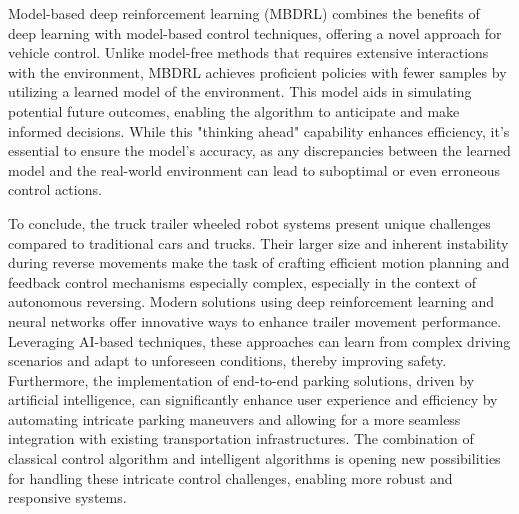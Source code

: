 Model-based deep reinforcement learning (MBDRL) combines the benefits of deep learning with model-based control techniques, offering a novel approach for vehicle control. Unlike model-free methods that requires extensive interactions with the environment, MBDRL achieves proficient policies with fewer samples by utilizing a learned model of the environment. This model aids in simulating potential future outcomes, enabling the algorithm to anticipate and make informed decisions. While this "thinking ahead" capability enhances efficiency, it's essential to ensure the model's accuracy, as any discrepancies between the learned model and the real-world environment can lead to suboptimal or even erroneous control actions.

To conclude, the truck trailer wheeled robot systems present unique challenges compared to traditional cars and trucks. Their larger size and inherent instability during reverse movements make the task of crafting efficient motion planning and feedback control mechanisms especially complex, especially in the context of autonomous reversing. Modern solutions using deep reinforcement learning and neural networks offer innovative ways to enhance trailer movement performance. Leveraging AI-based techniques, these approaches can learn from complex driving scenarios and adapt to unforeseen conditions, thereby improving safety. Furthermore, the implementation of end-to-end parking solutions, driven by artificial intelligence, can significantly enhance user experience and efficiency by automating intricate parking maneuvers and allowing for a more seamless integration with existing transportation infrastructures. The combination of classical control algorithm and intelligent algorithms is opening new possibilities for handling these intricate control challenges, enabling more robust and responsive systems.